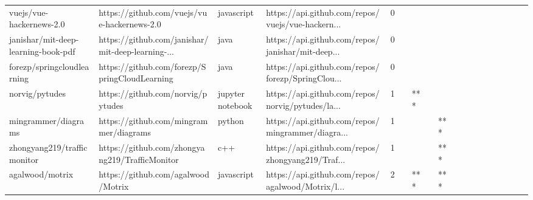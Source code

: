 \begin{tabular}{llllrlllllllllllll}
vuejs/vue-hackernews-2.0                           &        https://github.com/vuejs/vue-hackernews-2.0 &        javascript &  https://api.github.com/repos/vuejs/vue-hackern... &       0 &         &        &           &                &                 &        &           &           &          &          &       &              &          \\
janishar/mit-deep-learning-book-pdf                &  https://github.com/janishar/mit-deep-learning-... &              java &  https://api.github.com/repos/janishar/mit-deep... &       0 &         &        &           &                &                 &        &           &           &          &          &       &              &          \\
forezp/springcloudlearning                         &      https://github.com/forezp/SpringCloudLearning &              java &  https://api.github.com/repos/forezp/SpringClou... &       0 &         &        &           &                &                 &        &           &           &          &          &       &              &          \\
norvig/pytudes                                     &                  https://github.com/norvig/pytudes &  jupyter notebook &  https://api.github.com/repos/norvig/pytudes/la... &       1 &         &    *** &           &                &                 &        &           &           &          &          &       &              &          \\
mingrammer/diagrams                                &             https://github.com/mingrammer/diagrams &            python &  https://api.github.com/repos/mingrammer/diagra... &       1 &         &        &           &            *** &                 &        &           &           &          &          &       &              &          \\
zhongyang219/trafficmonitor                        &     https://github.com/zhongyang219/TrafficMonitor &               c++ &  https://api.github.com/repos/zhongyang219/Traf... &       1 &         &        &           &            *** &                 &        &           &           &          &          &       &              &          \\
agalwood/motrix                                    &                 https://github.com/agalwood/Motrix &        javascript &  https://api.github.com/repos/agalwood/Motrix/l... &       2 &         &    *** &           &            *** &                 &        &           &           &          &          &       &              &          \\

\end{tabular}
